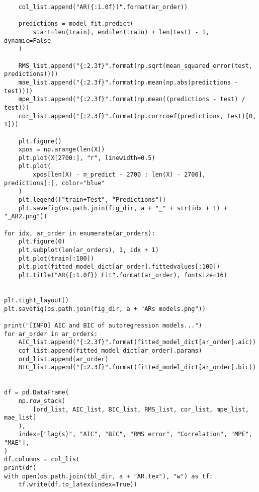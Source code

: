 \documentclass[12pt]{article}
\begin{document}
\begin{lstlisting}
    col_list.append("AR({:1.0f})".format(ar_order))

    predictions = model_fit.predict(
        start=len(train), end=len(train) + len(test) - 1, dynamic=False
    )

    RMS_list.append("{:2.3f}".format(np.sqrt(mean_squared_error(test, predictions))))
    mae_list.append("{:2.3f}".format(np.mean(np.abs(predictions - test))))
    mpe_list.append("{:2.3f}".format(np.mean((predictions - test) / test)))
    cor_list.append("{:2.3f}".format(np.corrcoef(predictions, test)[0, 1]))

    plt.figure()
    xpos = np.arange(len(X))
    plt.plot(X[2700:], "r", linewidth=0.5)
    plt.plot(
        xpos[len(X) - n_predict - 2700 : len(X) - 2700], predictions[:], color="blue"
    )
    plt.legend(["train+Test", "Predictions"])
    plt.savefig(os.path.join(fig_dir, a + "_" + str(idx + 1) + "_AR2.png"))

for idx, ar_order in enumerate(ar_orders):
    plt.figure(0)
    plt.subplot(len(ar_orders), 1, idx + 1)
    plt.plot(train[:100])
    plt.plot(fitted_model_dict[ar_order].fittedvalues[:100])
    plt.title("AR({:1.0f}) Fit".format(ar_order), fontsize=16)


plt.tight_layout()
plt.savefig(os.path.join(fig_dir, a + "ARs models.png"))

print("[INFO] AIC and BIC of autoregression models...")
for ar_order in ar_orders:
    AIC_list.append("{:2.3f}".format(fitted_model_dict[ar_order].aic))
    cof_list.append(fitted_model_dict[ar_order].params)
    ord_list.append(ar_order)
    BIC_list.append("{:2.3f}".format(fitted_model_dict[ar_order].bic))


df = pd.DataFrame(
    np.row_stack(
        [ord_list, AIC_list, BIC_list, RMS_list, cor_list, mpe_list, mae_list]
    ),
    index=["lag(s)", "AIC", "BIC", "RMS error", "Correlation", "MPE", "MAE"],
)
df.columns = col_list
print(df)
with open(os.path.join(tbl_dir, a + "AR.tex"), "w") as tf:
    tf.write(df.to_latex(index=True))
\end{lstlisting}
\end{document}
